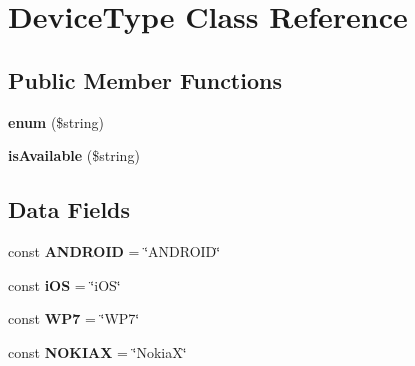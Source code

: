\hypertarget{class_device_type}{\section{Device\+Type Class Reference}
\label{class_device_type}
}
\subsection*{Public Member Functions}
\begin{DoxyCompactItemize}
\item 
\hypertarget{class_device_type_a7967c6e825979f8b2faefba3d95c3821}{{\bfseries enum} (\$string)}\label{class_device_type_a7967c6e825979f8b2faefba3d95c3821}

\item 
\hypertarget{class_device_type_a30537daeb912ea3e348c579c4f930841}{{\bfseries is\+Available} (\$string)}\label{class_device_type_a30537daeb912ea3e348c579c4f930841}

\end{DoxyCompactItemize}
\subsection*{Data Fields}
\begin{DoxyCompactItemize}
\item 
\hypertarget{class_device_type_a059aec7889298be80edc539f85ece8a6}{const {\bfseries A\+N\+D\+R\+O\+I\+D} = \char`\"{}A\+N\+D\+R\+O\+I\+D\char`\"{}}\label{class_device_type_a059aec7889298be80edc539f85ece8a6}

\item 
\hypertarget{class_device_type_a136bbb30354a40ce9ca64aa0e89dbf03}{const {\bfseries i\+O\+S} = \char`\"{}i\+O\+S\char`\"{}}\label{class_device_type_a136bbb30354a40ce9ca64aa0e89dbf03}

\item 
\hypertarget{class_device_type_a44fc5d9443ada9efd31a0f2d96878429}{const {\bfseries W\+P7} = \char`\"{}W\+P7\char`\"{}}\label{class_device_type_a44fc5d9443ada9efd31a0f2d96878429}

\item 
\hypertarget{class_device_type_a026b484d75053c43feb1780059519225}{const {\bfseries N\+O\+K\+I\+A\+X} = \char`\"{}Nokia\+X\char`\"{}}\label{class_device_type_a026b484d75053c43feb1780059519225}

\end{DoxyCompactItemize}
